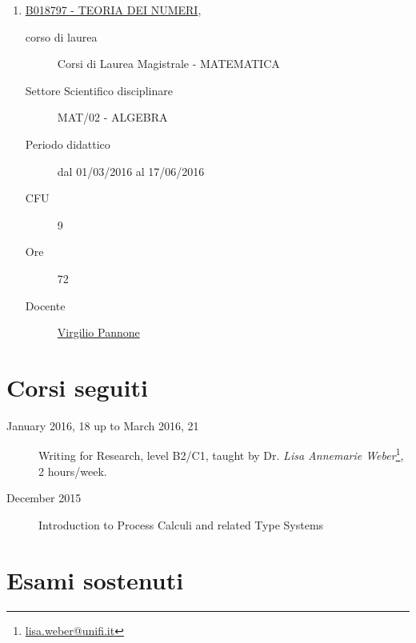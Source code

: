 \documentclass[11pt]{article}
\begin{document}
\begin{enumerate}
\begin{description}
    \end{description}

\item \href{http://www.unifi.it/index.php?module=ofform2&mode=1&cmd=3&AA=2015&afId=426607}{B018797 - TEORIA DEI NUMERI},
    \begin{description}
        \item[corso di laurea] Corsi di Laurea Magistrale - MATEMATICA
        \item[Settore Scientifico disciplinare] MAT/02 - ALGEBRA
        \item[Periodo didattico] dal 01/03/2016 al 17/06/2016
        \item[CFU] 9 
        \item[Ore] 72
        \item[Docente] \href{http://www.unifi.it/index.php?module=ofform2&mode=1&cmd=3&AA=2015&afId=426607}{Virgilio Pannone}

    \end{description}

\end{enumerate}



\section*{Corsi seguiti}

\begin{description}

\item[January 2016, 18 up to March 2016, 21] Writing for Research, level B2/C1, 
    taught by Dr. \emph{Lisa Annemarie Weber}\footnote{\url{lisa.weber@unifi.it}},
    2 hours/week.
\item[December 2015] Introduction to Process Calculi and related Type Systems

\item[%
] 

\end{description}

\section*{Esami sostenuti}

\begin{description}

\item[%
] 

\item[%
] 

\end{description}
\end{document}
